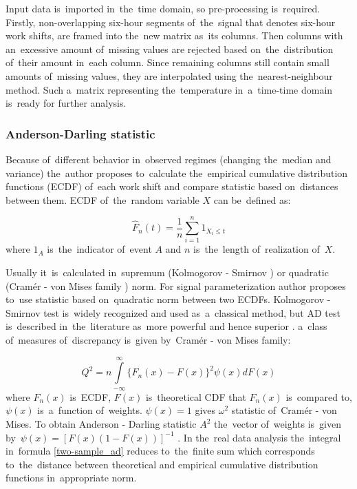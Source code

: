 Input data is~imported in~the~time domain, so pre-processing is~required. Firstly, non-overlapping six-hour segments of~the~signal that denotes six-hour work shifts, are framed into the~new matrix as~its columns. Then columns with an~excessive amount of~missing values are rejected based on~the~distribution of~their amount in~each column. Since remaining columns still contain small amounts of~missing values, they are interpolated using the~nearest-neighbour method. Such a~matrix representing the~temperature in~a~time-time domain is~ready for further analysis.

\subsubsection{Anderson-Darling statistic}\label{met_ad}

Because of~different behavior in~observed regimes (changing the~median and variance) the~author proposes to~calculate the~empirical cumulative distribution functions (ECDF) of~each work shift and compare statistic based on~distances between them. ECDF of~the~random variable $X$ can be~defined as:

\begin{equation}
  \hat{F}_n(t)=\frac{1}{n}\sum_{i=1}^n 1_{X_i\leq t}
\end{equation}
where $1_A$ is~the~indicator of~event $A$ and $n$ is~the~length of~realization of~$X$. 

Usually it~is~calculated in~supremum (Kolmogorov - Smirnov \cite{massey1951kolmogorov}) or quadratic (Cram{\'e}r - von Mises family \cite{laio2004cramer}) norm. For signal parameterization author proposes to~use statistic based on~quadratic norm between two ECDFs. Kolmogorov - Smirnov test is~widely recognized and used as~a~classical method, but AD test is~described in~the~literature as~more powerful and hence superior \cite{razali2011power,engmann2011comparing}. a~class of~measures of~discrepancy is~given by~Cram{\'e}r - von Mises family:

\begin{equation}
\label{one-sample_ad}
  Q^2=n \int\limits_{-\infty}^{\infty} \{F_n(x) - F(x) \}^2 \psi(x)dF(x)
\end{equation}
where $F_n(x)$ is~ECDF, $F(x)$ is~theoretical CDF that $F_n(x)$ is~compared to, $\psi(x)$ is~a~function of~weights. $\psi(x)=1$ gives $\omega^2$ statistic of~Cram{\'e}r - von Mises. To obtain Anderson - Darling statistic $A^2$ the~vector of~weights is~given by~$\psi(x)=[F(x)(1-F(x))]^{-1}$ \cite{pettitt1976two,cizek2005statistical}. In the~real data analysis the~integral in~formula \ref{two-sample_ad} reduces to~the~finite sum which corresponds to~the~distance between theoretical and empirical cumulative distribution functions in~appropriate norm.

